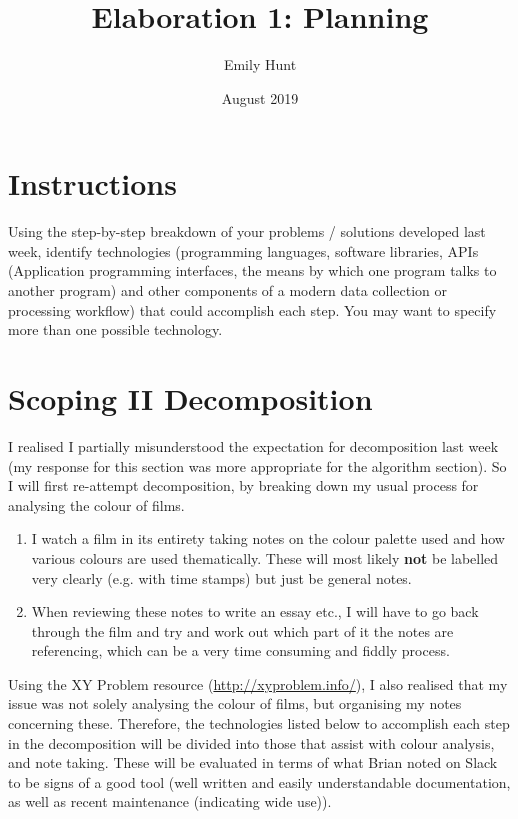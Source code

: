 \documentclass{article}
\title{\textbf{Elaboration 1: Planning}}
\author{Emily Hunt}
\date{August 2019}
\begin{document}
\maketitle

\section*{Instructions}
Using the step-by-step breakdown of your problems / solutions developed last week, identify technologies (programming languages, software libraries, APIs (Application programming interfaces, the means by which one program talks to another program) and other components of a modern data collection or processing workflow) that could accomplish each step. You may want to specify more than one possible technology. 

\section*{Scoping II Decomposition}
I realised I partially misunderstood the expectation for decomposition last week (my response for this section was more appropriate for the algorithm section). So I will first re-attempt decomposition, by breaking down my usual process for analysing the colour of films.

\begin{enumerate}
    \item I watch a film in its entirety taking notes on the colour palette used and how various colours are used thematically. These will most likely \textbf{not} be labelled very clearly (e.g. with time stamps) but just be general notes.
    \item When reviewing these notes to write an essay etc., I will have to go back through the film and try and work out which part of it the notes are referencing, which can be a very time consuming and fiddly process.
\end{enumerate} 

Using the XY Problem resource (\url{http://xyproblem.info/}), I also realised that my issue was not solely analysing the colour of films, but organising my notes concerning these. Therefore, the technologies listed below to accomplish each step in the decomposition will be divided into those that assist with colour analysis, and note taking. These will be evaluated in terms of what Brian noted on Slack to be signs of a good tool (well written and easily understandable documentation, as well as recent maintenance (indicating wide use)).
\end{document}
